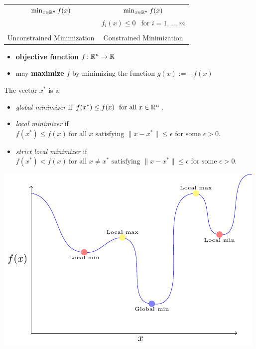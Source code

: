 \documentclass[../open-optimization/open-optimization.tex]{subfiles}
\begin{document}
\begin{center}
\begin{tabular}{|c|c|}
\hline
$
\min_{x \in {\mathbb{R}}^n} f(x)
$
& 
$\min_{x \in {\mathbb{R}}^n} f(x)$ \\
&$ f_i(x) \leq 0  \ \ \text{ for } i=1, \dots, m$\\
&\\
Unconstrained Minimization & Constrained Minimization\\
\hline
\end{tabular}
\end{center}

\begin{itemize}
\item \textbf{objective function} $f \colon {\mathbb{R}}^n \to {\mathbb{R}}$
\item may \textbf{maximize} $f$ by minimizing the function $g(x) := -f(x)$
\end{itemize}


\begin{definition}
The vector $x^*$ is a
\begin{itemize}
\item  \emph{global minimizer} if $f(x^*) \leq f(x) \ \text{ for all } x \in {\mathbb{R}}^n$.
\item  \emph{local minimizer} if $f(x^*) \leq f(x) \ \text{for all } x \text{ satisfying } \| x- x^*\| \leq \epsilon \text{ for some } \epsilon > 0$.
\item \emph{strict local minimizer} if $f(x^*) < f(x) \ \text{for all } x \neq x^* \text{ satisfying } \| x- x^*\| \leq \epsilon \text{ for some } \epsilon > 0$.
\end{itemize}
\end{definition}

\includegraphics[scale = 1]{local-min}
\end{document}

